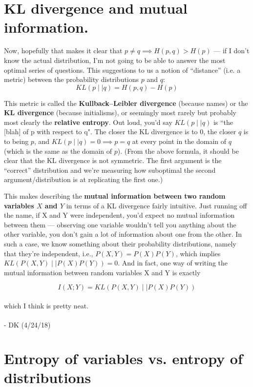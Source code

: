 \documentclass[letterpaper,12pt]{report}
\begin{document}
\section{KL divergence and mutual information.}\label{kl-divergence-and-mutual-information}


Now, hopefully that makes it clear that \( p \neq q \implies H(p,q)
> H(p) \) --- if I don't know the actual distribution, I'm
not going to be able to answer the most optimal series of questions.
This suggestions to us a notion of ``distance'' (i.e. a metric) between
the probability distributions \(p\) and \(q\):
\[ KL(p \mid\mid q) = H(p,q) - H(p) \]

This metric is called the \textbf{Kullback--Leibler divergence}
 
(because
names) or the \textbf{KL divergence} (because initialisms), or seemingly
most rarely but probably most clearly the \textbf{relative entropy}. Out
loud, you'd say \(KL(p \mid\mid q)\) is ``the {[}blah{]} of p with
respect to q". The closer the KL divergence is to 0, the closer \(q\) is
to being \(p\), and \( KL(p \mid\mid q) = 0 \implies p = q \) at every
point in the domain of \(q\) (which is the same as the domain of \(p\)). 
(From the above formula, 
it should be clear that the KL divergence is not symmetric. The
first argument is the ``correct'' distribution and we're measuring how suboptimal
the second argument/distribution is at replicating the first one.)

This makes describing the
\textbf{mutual information between two random variables \(X\) and \(Y\)}
in terms of a KL divergence fairly intuitive. Just
running off the name, if X and Y were independent, you'd expect no
mutual information between them --- 
observing one variable wouldn't tell you anything about the other variable, you don't gain
a lot of information about one from the other. 
In such a case, we know something about their probability distributions,
namely that they're independent, i.e., \(P(X,Y) = P(X)P(Y)\), which implies 
\( KL\left(P(X,Y)\mid\mid P(X)P(Y)\right) = 0\). 
And in fact, one way of writing the mutual information 
between random variables X and Y is exactly

\[ I(X;Y) = KL\left(P(X,Y)\mid\mid P(X)P(Y)\right) \]
\\
which I think is pretty neat.
\\
\\
- DK (4/24/18)

\section{Entropy of variables vs. entropy of distributions}\label{entropy-of-variables-vs-entropy-of-distributions}
\end{document}

